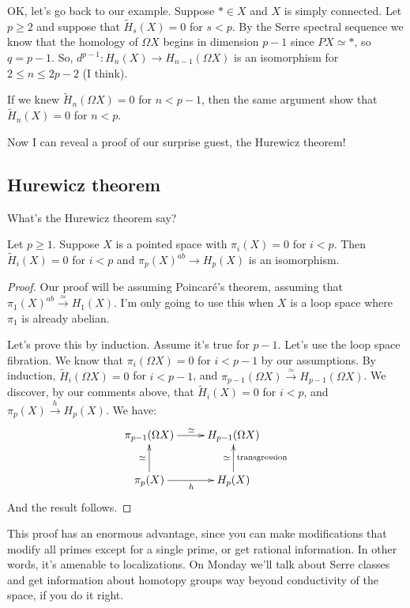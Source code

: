 OK, let's go back to our example.
Suppose $\ast \in X$ and $X$ is simply connected.
Let $p\geq 2$ and suppose that $\widetilde{H}_s(X) = 0$ for $s<p$.
By the Serre spectral sequence we know that the homology of $\Omega X$ begins in dimension $p-1$ since $PX\simeq \ast$, so $q = p-1$.
So, $d^{p-1}:H_n(X) \to H_{n-1}(\Omega X)$ is an isomorphism for $2\leq n\leq 2p-2$ (I think).
\begin{remark}
    If we knew $\widetilde{H}_n(\Omega X) = 0$ for $n<p-1$, then the same argument show that $\widetilde{H}_n(X) = 0$ for $n<p$.
\end{remark}
Now I can reveal a proof of our surprise guest, the Hurewicz theorem!
\subsection*{Hurewicz theorem}
What's the Hurewicz theorem say?
\begin{theorem}
    Let $p\geq 1$.
    Suppose $X$ is a pointed space with $\pi_i(X) = 0$ for $i<p$.
    Then $\widetilde{H}_i(X) = 0$ for $i<p$ and $\pi_p(X)^{ab}\to H_p(X)$ is an isomorphism.
\end{theorem}
\begin{proof}
    Our proof will be assuming Poincar\'{e}'s theorem, assuming that $\pi_1(X)^{ab}\xrightarrow{\simeq} H_1(X)$.
    I'm only going to use this when $X$ is a loop space where $\pi_1$ is already abelian.

    Let's prove this by induction.
    Assume it's true for $p-1$.
    Let's use the loop space fibration.
    We know that $\pi_i(\Omega X) = 0$ for $i<p-1$ by our assumptions.
    By induction, $\widetilde{H}_i(\Omega X) = 0$ for $i<p-1$, and $\pi_{p-1}(\Omega X) \xrightarrow{\simeq} H_{p-1}(\Omega X)$.
    We discover, by our comments above, that $\widetilde{H}_i(X) = 0$ for $i<p$, and $\pi_p(X)\xrightarrow{h}H_p(X)$. We have:
    \begin{equation*}
	\xymatrix{
	    \pi_{p-1}(\Omega X)\ar[r]^\simeq & H_{p-1}(\Omega X)\\
	    \pi_p(X)\ar[u]^\simeq \ar[r]_h & H_p(X)\ar[u]^{\simeq}_{\text{transgression}}
	    }
    \end{equation*}
    And the result follows.
\end{proof}
This proof has an enormous advantage, since you can make modifications that modify all primes except for a single prime, or get rational information.
In other words, it's amenable to localizations.
On Monday we'll talk about Serre classes and get information about homotopy groups way beyond conductivity of the space, if you do it right.
